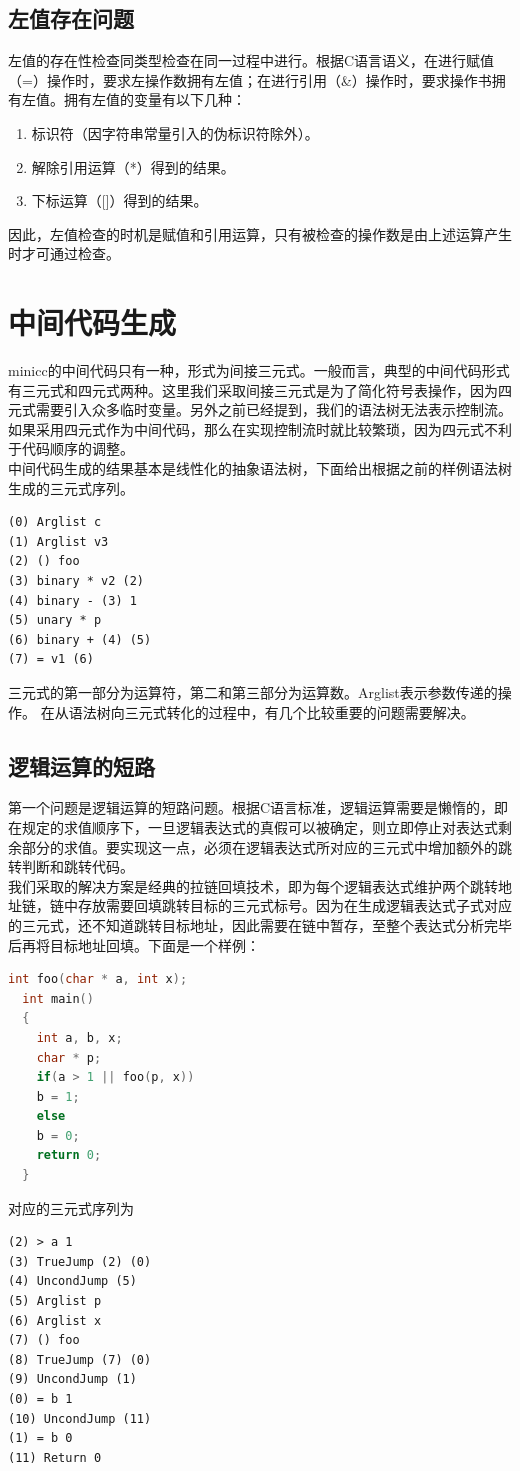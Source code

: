 \documentclass[12pt,a4paper,Flow]{report}
\begin{document}
\subsection{左值存在问题}
左值的存在性检查同类型检查在同一过程中进行。根据C语言语义，在进行赋值（=）操作时，要求左操作数拥有左值；在进行引用（\&）操作时，要求操作书拥有左值。拥有左值的变量有以下几种：
\begin{enumerate}
\item 标识符（因字符串常量引入的伪标识符除外）。
\item 解除引用运算（*）得到的结果。
\item 下标运算（[]）得到的结果。
\end{enumerate}
因此，左值检查的时机是赋值和引用运算，只有被检查的操作数是由上述运算产生时才可通过检查。
\section{中间代码生成}
minicc的中间代码只有一种，形式为间接三元式。一般而言，典型的中间代码形式有三元式和四元式两种。这里我们采取间接三元式是为了简化符号表操作，因为四元式需要引入众多临时变量。另外之前已经提到，我们的语法树无法表示控制流。如果采用四元式作为中间代码，那么在实现控制流时就比较繁琐，因为四元式不利于代码顺序的调整。\\
\indent 中间代码生成的结果基本是线性化的抽象语法树，下面给出根据之前的样例语法树生成的三元式序列。
\begin{verbatim}
(0) Arglist c 
(1) Arglist v3 
(2) () foo 
(3) binary * v2 (2) 
(4) binary - (3) 1 
(5) unary * p 
(6) binary + (4) (5) 
(7) = v1 (6) 
\end{verbatim}
三元式的第一部分为运算符，第二和第三部分为运算数。Arglist表示参数传递的操作。
\indent 在从语法树向三元式转化的过程中，有几个比较重要的问题需要解决。
\subsection{逻辑运算的短路}
第一个问题是逻辑运算的短路问题。根据C语言标准，逻辑运算需要是懒惰的，即在规定的求值顺序下，一旦逻辑表达式的真假可以被确定，则立即停止对表达式剩余部分的求值。要实现这一点，必须在逻辑表达式所对应的三元式中增加额外的跳转判断和跳转代码。\\
\indent 我们采取的解决方案是经典的拉链回填技术，即为每个逻辑表达式维护两个跳转地址链，链中存放需要回填跳转目标的三元式标号。因为在生成逻辑表达式子式对应的三元式，还不知道跳转目标地址，因此需要在链中暂存，至整个表达式分析完毕后再将目标地址回填。下面是一个样例：
\begin{lstlisting}[language=c]
  int foo(char * a, int x);
  int main()
  {
    int a, b, x;
    char * p;
    if(a > 1 || foo(p, x))
    b = 1;
    else
    b = 0;
    return 0;
  }
\end{lstlisting}
对应的三元式序列为
\begin{verbatim}
(2) > a 1 
(3) TrueJump (2) (0) 
(4) UncondJump (5) 
(5) Arglist p 
(6) Arglist x 
(7) () foo 
(8) TrueJump (7) (0) 
(9) UncondJump (1) 
(0) = b 1 
(10) UncondJump (11) 
(1) = b 0 
(11) Return 0 
\end{verbatim}
\end{document}
